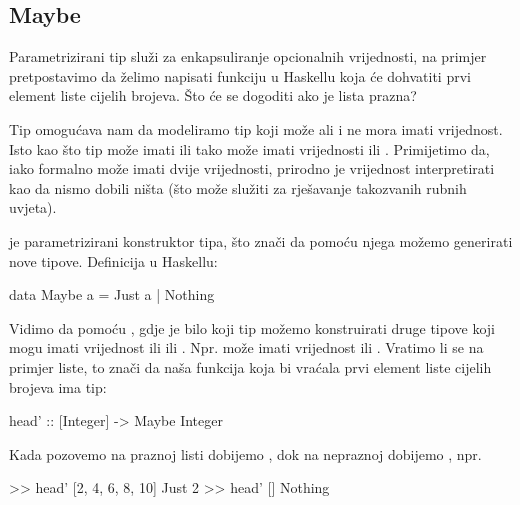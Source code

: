   \subsection{Maybe}
  Parametrizirani tip  služi za enkapsuliranje opcionalnih
  vrijednosti, na primjer pretpostavimo da želimo napisati funkciju u Haskellu koja će
  dohvatiti prvi element liste cijelih brojeva. Što će se dogoditi ako je lista prazna?

  Tip  omogućava nam da modeliramo tip koji može ali i ne mora
  imati vrijednost. Isto kao što tip  može imati 
  ili  tako  može imati vrijednosti  ili
  . Primijetimo da, iako formalno  može imati dvije
  vrijednosti, prirodno je vrijednost  interpretirati kao da nismo dobili ništa (što može
  služiti za rješavanje takozvanih rubnih uvjeta).

   je parametrizirani konstruktor tipa, što znači da pomoću njega možemo generirati nove tipove. Definicija  u
  Haskellu:
  \begin{mcode}
    data Maybe a = Just a | Nothing
  \end{mcode}
  Vidimo da pomoću , gdje je  bilo koji tip možemo
  konstruirati druge tipove koji mogu imati vrijednost ili  ili
  . Npr.  može imati vrijednost  ili . Vratimo li se na primjer liste, to znači da naša funkcija
  koja bi vraćala prvi element liste cijelih brojeva ima tip:
  \begin{mcode}
    head' :: [Integer] -> Maybe Integer
  \end{mcode}
  Kada pozovemo  na praznoj listi dobijemo , dok na
  nepraznoj dobijemo , npr.
  \begin{mcode}
    >> head' [2, 4, 6, 8, 10]
    Just 2
    >> head' []
    Nothing
  \end{mcode}
